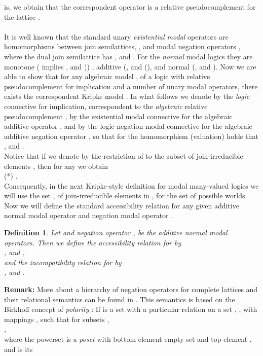 \documentclass[10pt,twocolumn]{article}
\newtheorem{definition}{Definition}
\begin{document}
is, we obtain that the correspondent operator  is a relative pseudocomplement for the
lattice .
\\  \\
It is well known that the standard unary \emph{existential modal}
operators are homomorphisms between join semilattices,
, and
modal negation operators , where the dual join
semilattice  has , and . For the \emph{normal} modal
logics they are monotone ( implies
, and )) , additive (, and (),
 and normal (, and ).
 Now we are able to
show that for any algebraic model , of a logic
 with relative pseudocomplement for implication and a number of
unary modal operators, there exists the correspondent Kripke model . In what follows we denote by
 the \emph{logic} connective for implication,
correspondent to the \emph{algebraic} relative pseudocomplement
, by  the existential modal
connective for the algebraic additive operator , and by
 the logic negation modal connective for the algebraic
additive negation operator , so that for the
homomorphism (valuation)  holds
that ,  and .\\
Notice that if we denote by  the restriction of  to the subset of join-irreducible elements
, then for any  we
obtain\\
(*)  . \\
Consequently, in the next Kripke-style definition for modal
many-valued logics we will use the set , of
join-irreducible elements in
, for the set of possible worlds.\\
Now we will define the standard accessibility relation for any given
additive normal modal operator  and negation modal operator
.
\begin{definition} \label{def:frame} Let  and  negation operator
, be  the additive normal modal  operators. Then we
define the accessibility
relation for  by\\
, and ,\\
and the incompatibility relation for  by\\
,
and .
\end{definition}
\textbf{Remark:} More about a hierarchy of negation operators for
complete lattices  and their relational semantics can be found in
\cite{Majk06ml}. This semantics is based on the Birkhoff concept of
\emph{polarity} \cite{Birkh40}: If  is a set with a
particular relation on a set , ,  with
mappings
, such that for subsets , \\
,\\
where the powerset  is a  \emph{poset} with bottom element
empty set  and top element , and  is its
\end{document}

